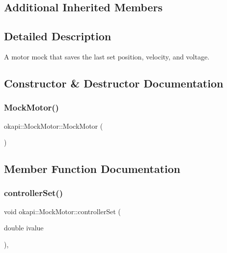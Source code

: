 \subsection*{Additional Inherited Members}


\subsection{Detailed Description}
A motor mock that saves the last set position, velocity, and voltage. 

\subsection{Constructor \& Destructor Documentation}
\mbox{\label{classokapi_1_1MockMotor_a7839202ec706aa1cdec42d14d882430c}} 
\subsubsection{\texorpdfstring{MockMotor()}{MockMotor()}}
{\footnotesize\ttfamily okapi\+::\+Mock\+Motor\+::\+Mock\+Motor (\begin{DoxyParamCaption}{ }\end{DoxyParamCaption})}



\subsection{Member Function Documentation}
\mbox{\label{classokapi_1_1MockMotor_a51dc6e5e6995ba24cf40f4687821ea87}} 
\subsubsection{\texorpdfstring{controllerSet()}{controllerSet()}}
{\footnotesize\ttfamily void okapi\+::\+Mock\+Motor\+::controller\+Set (\begin{DoxyParamCaption}\item[{double}]{ivalue }\end{DoxyParamCaption})\hspace{0.3cm}{\ttfamily [override]}, {\ttfamily [virtual]}}



